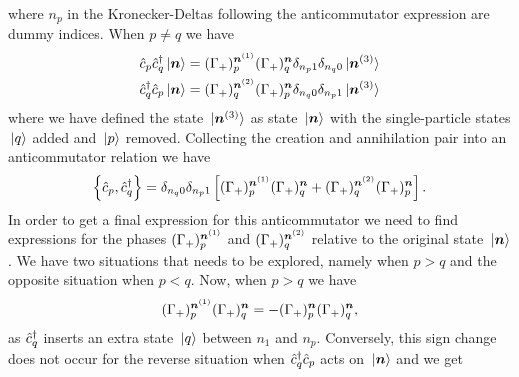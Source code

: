             where $n_p$ in the Kronecker-Deltas following the anticommutator
            expression are dummy indices.
            When $p \neq q$ we have
            \begin{align}
                \hat{c}_{p}\hat{c}_{q}^{\dagger}\ket*{\boldsymbol{n}}
                &=
                (\Gamma_{+})^{\boldsymbol{n}^{(1)}}_{p}
                (\Gamma_{+})^{\boldsymbol{n}}_{q}
                \delta_{n_p 1} \delta_{n_q 0}
                \ket*{\boldsymbol{n}^{(3)}}
                \\
                \hat{c}_{q}^{\dagger}\hat{c}_{p}\ket*{\boldsymbol{n}}
                &=
                (\Gamma_{+})^{\boldsymbol{n}^{(2)}}_{q}
                (\Gamma_{+})^{\boldsymbol{n}}_{p}
                \delta_{n_q 0} \delta_{n_p 1}
                \ket*{\boldsymbol{n}^{(3)}}
            \end{align}
            where we have defined the state $\ket*{\boldsymbol{n}^{(3)}}$ as state
            $\ket*{\boldsymbol{n}}$ with the single-particle states $\ket*{q}$ added and
            $\ket*{p}$ removed.
            Collecting the creation and annihilation pair into an anticommutator
            relation we have
            \begin{align}
                \left\{\hat{c}_{p}, \hat{c}_{q}^{\dagger}\right\}
                =
                \delta_{n_q 0} \delta_{n_p 1}
                \left[ 
                    (\Gamma_{+})^{\boldsymbol{n}^{(1)}}_{p}
                    (\Gamma_{+})^{\boldsymbol{n}}_{q}
                    +
                    (\Gamma_{+})^{\boldsymbol{n}^{(2)}}_{q}
                    (\Gamma_{+})^{\boldsymbol{n}}_{p}
                 \right].
            \end{align}
            In order to get a final expression for this anticommutator we need
            to find expressions for the phases
            $(\Gamma_{+})^{\boldsymbol{n}^{(1)}}_{p}$ and
            $(\Gamma_{+})^{\boldsymbol{n}^{(2)}}_{q}$ relative to the original state
            $\ket*{\boldsymbol{n}}$.
            We have two situations that needs to be explored, namely when $p >
            q$ and the opposite situation when $p < q$.
            Now, when $p > q$ we have
            \begin{align}
                (\Gamma_{+})^{\boldsymbol{n}^{(1)}}_{p}
                (\Gamma_{+})^{\boldsymbol{n}}_{q}
                =
                -
                (\Gamma_{+})^{\boldsymbol{n}}_{p}
                (\Gamma_{+})^{\boldsymbol{n}}_{q},
            \end{align}
            as $\hat{c}_{q}^{\dagger}$ inserts an extra state $\ket*{q}$ between $n_1$ and
            $n_p$.
            Conversely, this sign change does not occur for the reverse
            situation when $\hat{c}_{q}^{\dagger}\hat{c}_{p}$ acts on $\ket*{\boldsymbol{n}}$ and we get

